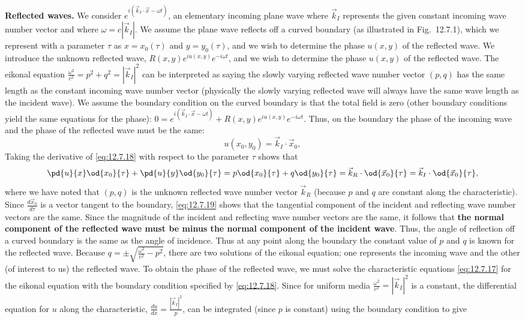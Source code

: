 \textbf{Reflected waves.}  We consider $e^{i(\vec{k}_I\cdot\vec{x} - \omega t)}$, an elementary incoming plane wave where $\vec{k}_I$ represents the given constant incoming wave number vector and where $\omega = c|\vec{k}_I|$.  We assume the plane wave reflects off a curved boundary (as illustrated in Fig.~12.7.1), which we represent with a parameter $\tau$ as $x = x_0(\tau)$ and $y = y_0(\tau)$, and we wish to determine the phase $u(x,y)$ of the reflected wave.  We introduce the unknown reflected wave, $R(x,y)e^{iu(x,y)}e^{-i\omega t}$, and we wish to determine the phase $u(x,y)$ of the reflected wave.  The eikonal equation $\frac{\omega^2}{c^2} = p^2 + q^2 = |\vec{k}_I|^2$ can be interpreted as saying the slowly varying reflected wave number vector $(p,q)$ has the same length as the constant incoming wave number vector (physically the slowly varying reflected wave will always have the same wave length as the incident wave).  We assume the boundary condition on the curved boundary is that the total field is zero (other boundary conditions yield the same equations for the phase):  $0 = e^{i(\vec{k}_I\cdot\vec{x} - \omega t)} + R(x,y)e^{iu(x,y)}e^{-i\omega t}$.  Thus, on the boundary the phase of the incoming wave and the phase of the reflected wave must be the same:
\begin{equation}
\label{eq:12.7.18}
u(x_0, y_0) = \vec{k}_I \cdot \vec{x}_0,
\end{equation}
Taking the derivative of \eqref{eq:12.7.18} with respect to the parameter $\tau$ shows that
\begin{equation}
\label{eq:12.7.19}
\pd{u}{x}\od{x_0}{\tau} + \pd{u}{y}\od{y_0}{\tau} = p\od{x_0}{\tau} + q\od{y_0}{\tau} = \vec{k}_R \cdot \od{\vec{x}_0}{\tau} = \vec{k}_I \cdot \od{\vec{x}_0}{\tau},
\end{equation}
where we have noted that $(p,q)$ is the unknown reflected wave number vector $\vec{k}_R$ (because $p$ and $q$ are constant along the characteristic).  Since $\frac{d\vec{x}_0}{d\tau}$ is a vector tangent to the boundary, \eqref{eq:12.7.19} shows that the tangential component of the incident and reflecting wave number vectors are the same.  Since the magnitude of the incident and reflecting wave number vectors are the same, it follows that \textbf{the normal component of the reflected wave must be minus the normal component of the incident wave}.  Thus, the angle of reflection off a curved boundary is the same as the angle of incidence.  Thus at any point along the boundary the constant value of $p$ and $q$ is known for the reflected wave.  Because $q = \pm\sqrt{\frac{\omega^2}{c^2} - p^2}$, there are two solutions of the eikonal equation; one represents the incoming wave and the other (of interest to us) the reflected wave.  To obtain the phase of the reflected wave, we must solve the characteristic equations \eqref{eq:12.7.17} for the eikonal equation with the boundary condition specified by \eqref{eq:12.7.18}.  Since for uniform media $\frac{\omega^2}{c^2} = |\vec{k}_I|^2$ is a constant, the differential equation for $u$ along the characteristic, $\frac{du}{dx} = \frac{|\vec{k}_I|^2}{p}$, can be integrated (since $p$ is constant) using the boundary condition to give
